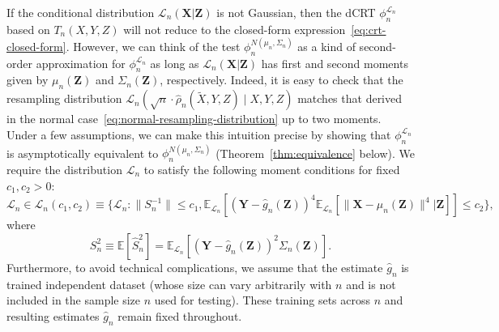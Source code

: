 \documentclass[12pt]{article}
\theoremstyle{definition}
\theoremstyle{remark}
\newcommand{\prx}{\bm X}
\newcommand{\srx}{X}
\newcommand{\prz}{\bm Z}
\newcommand{\srz}{Z}
\newcommand{\srxk}{\widetilde X}
\newcommand{\pry}{{\bm Y}}
\newcommand{\sry}{Y}
\begin{document}
If the conditional distribution $\mathcal L_n(\prx|\prz)$ is not Gaussian, then the dCRT $\phi_n^{\mathcal L_n}$ based on $T_n(\srx, \sry, \srz)$ will not reduce to the closed-form expression~\eqref{eq:crt-closed-form}. However, we can think of the test $\phi^{N(\mu_n, \Sigma_n)}_n$ as a kind of second-order approximation for $\phi_n^{\mathcal L_n}$ as long as $\mathcal L_n(\prx|\prz)$ has first and second moments given by $\mu_n(\prz)$ and $\Sigma_n(\prz)$, respectively. Indeed, it is easy to check that the resampling distribution $\mathcal L_n(\sqrt n \cdot \widehat \rho_n(\srxk, \sry, \srz) \mid \srx, \sry, \srz)$ matches that derived in the normal case~\eqref{eq:normal-resampling-distribution} up to two moments. Under a few assumptions, we can make this intuition precise by showing that $\phi_n^{\mathcal L_n}$ is asymptotically equivalent to $\phi^{N(\mu_n, \Sigma_n)}_n$ (Theorem~\ref{thm:equivalence} below). We require the distribution $\mathcal L_n$ to satisfy the following moment conditions for fixed $c_1, c_2 > 0$:
\small
\begin{equation}
\mathcal L_n \in \mathscr L_n(c_1, c_2) \equiv \{\mathcal L_n: \|S_{n}^{-1}\| \leq c_1, \mathbb E_{\mathcal L_n}\left[(\pry - \widehat g_n(\prz))^{4} \mathbb E_{\mathcal L_n}[\|\prx - \mu_n(\prz)\|^{4}|\prz]\right] \leq c_2 \},
\label{eq:moment-conditions}
\end{equation} 
\normalsize
where
\begin{equation}
S_n^2 \equiv \mathbb E[\widehat S_n^2] = \mathbb E_{\mathcal L_n}\left[(\pry - \widehat g_n(\prz))^2 \Sigma_n(\prz)\right].
\end{equation}
Furthermore, to avoid technical complications, we assume that the estimate $\widehat g_n$ is trained independent dataset (whose size can vary arbitrarily with $n$ and is not included in the sample size $n$ used for testing). These training sets across $n$ and resulting estimates $\widehat g_n$ remain fixed throughout.
\end{document}
